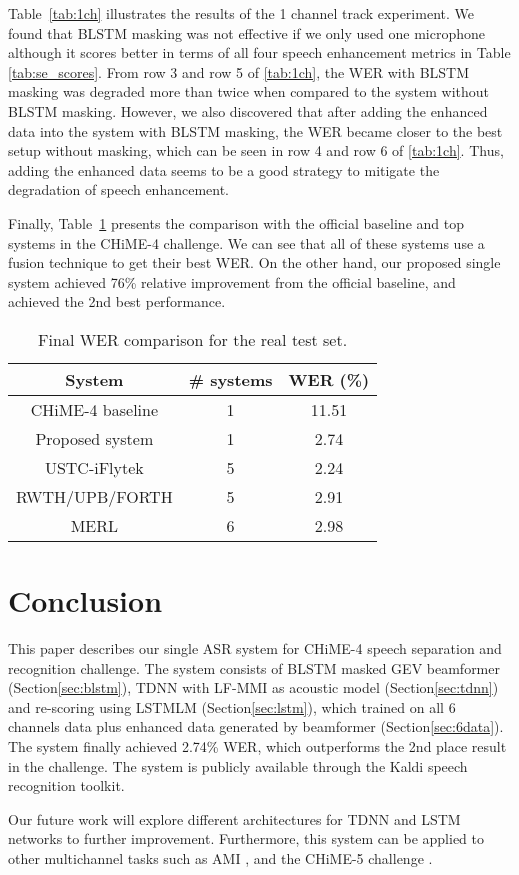 \documentclass[a4paper]{article}
\begin{document}
Table~\ref{tab:1ch} illustrates the results of the 1 channel track experiment. 
We found that BLSTM masking was not effective if we only used one microphone although it scores better in terms of all four speech enhancement metrics in Table \ref{tab:se_scores}.
From row 3 and row 5 of \ref{tab:1ch}, the WER with BLSTM masking was degraded more than twice when compared to the system without BLSTM masking. 
However, we also discovered that after adding the enhanced data into the system with BLSTM masking, the WER became closer to the best setup without masking, which can be seen in row 4 and row 6 of \ref{tab:1ch}.
Thus, adding the enhanced data seems to be a good strategy to mitigate the degradation of speech enhancement.

Finally, Table~\ref{tab:comparision} presents the comparison with the official baseline and top systems in the CHiME-4 challenge. 
We can see that all of these systems use a fusion technique to get their best WER. 
On the other hand, our proposed single system achieved 76\% relative improvement from the official baseline, and achieved the 2nd best performance.

\begin{table}[h]
  \caption{Final WER comparison for the real test set.}
  \label{tab:comparision}
  \centering
  \begin{tabular}{ c  c c }
    \toprule
    System & \# systems & WER (\%) \\
   	\midrule
    CHiME-4 baseline \cite{vincent2017analysis} & 1 & 11.51 \\
    Proposed system & 1 & 2.74 \\
    \midrule
    USTC-iFlytek\cite{du2016ustc} & 5 & 2.24 \\
    RWTH/UPB/FORTH\cite{menne2016rwth} & 5 & 2.91 \\
    MERL \cite{erdogan2016multi} & 6 & 2.98 \\
    \bottomrule
  \end{tabular}
\end{table}

\section{Conclusion}
This paper describes our single ASR system for CHiME-4 speech separation and recognition challenge. 
The system consists of BLSTM masked GEV beamformer (Section\ref{sec:blstm}), TDNN with LF-MMI as acoustic model (Section\ref{sec:tdnn}) and re-scoring using LSTMLM (Section\ref{sec:lstm}), which trained on all 6 channels data plus enhanced data generated by beamformer (Section\ref{sec:6data}). 
The system finally achieved 2.74\% WER, which outperforms the 2nd place result in the challenge.
The system is publicly available through the Kaldi speech recognition toolkit.

Our future work will explore different architectures for TDNN and LSTM networks to further improvement. 
Furthermore, this system can be applied to other multichannel tasks such as AMI \cite{mccowan2005ami}, and the CHiME-5 challenge \cite{chime2018asr}.





\end{document}

